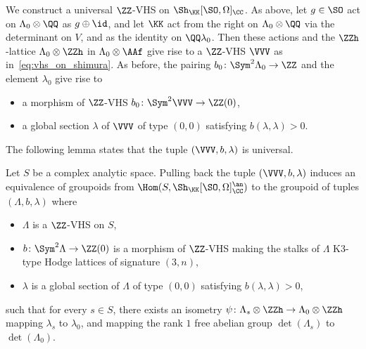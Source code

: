 We construct a universal $\ZZ$-VHS on $\Sh_{\KK}[\SO,\Omega]_{\CC}$. As above, let $g \in \SO$ act on $\Lambda_0 \otimes \QQ$ as $g \oplus \id$, and let $\KK$ act from the right on $\Lambda_0 \otimes \QQ$ via the determinant on $V$, and as the identity on $\QQ \lambda_0$. Then these actions and the $\ZZh$-lattice $\Lambda_0 \otimes \ZZh$ in $\Lambda_0 \otimes \AAf$ give rise to a $\ZZ$-VHS $\VVV$ as in~\eqref{eq:vhs_on_shimura}. As before, the pairing $b_0\colon \Sym^2 \Lambda_0 \rightarrow \ZZ$ and the element $\lambda_0$ give rise to
\begin{itemize}
\item a morphism of $\ZZ$-VHS $b_0\colon \Sym^2 \VVV \rightarrow \ZZ(0)$,
\item a global section $\lambda$ of $\VVV$ of type $(0,0)$ satisfying $b(\lambda,\lambda) > 0$.
\end{itemize}
The following lemma states that the tuple $(\VVV,b,\lambda)$ is universal.
\begin{lemma}\label{lem:moduli_vhs_even}
Let $S$ be a complex analytic space. Pulling back the tuple $(\VVV,b,\lambda)$ induces an equivalence of groupoids from $\Hom(S,\Sh_{\KK}[\SO,\Omega]_{\CC}^{\an})$ to the groupoid of tuples $(\Lambda,b,\lambda)$ where
\begin{itemize}
\item $\Lambda$ is a $\ZZ$-VHS on $S$,
\item $b\colon \Sym^2 \Lambda \rightarrow \ZZ(0)$ is a morphism of $\ZZ$-VHS making the stalks of $\Lambda$ K3-type Hodge lattices of signature $(3,n)$,
\item $\lambda$ is a global section of $\Lambda$ of type $(0,0)$ satisfying $b(\lambda,\lambda) > 0$,
\end{itemize}
    such that for every $s \in S$, there exists an isometry $\psi\colon \Lambda_s \otimes \ZZh \rightarrow \Lambda_0 \otimes \ZZh$ mapping $\lambda_{s}$ to $\lambda_0$, and mapping the rank $1$ free abelian group $\det(\Lambda_s)$ to $\det(\Lambda_0)$.
\end{lemma}
